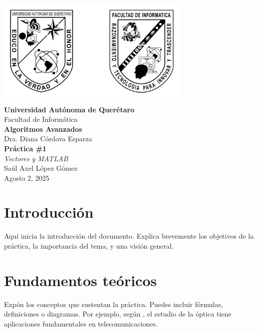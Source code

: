 \documentclass[12pt,a4paper]{article}
\begin{document}
\begin{titlepage}
    \begin{center}
        \includegraphics[width=0.7\textwidth]{images/logo_uaq_info.png}
        \vspace{1cm}

        {\Large \textbf{Universidad Autónoma de Querétaro}}\\[0.5cm]
        {\large Facultad de Informática}\\[1cm]

        {\Large \textbf{Algoritmos Avanzados}}\\[0.5cm]
        {\large Dra. Diana Córdova Esparza}\\[1.5cm]

        {\LARGE \textbf{Práctica \#1}}\\[0.2cm]
        {\large \textit{Vectores y MATLAB}}\\[1cm]

        {\large Saúl Axel López Gómez}\\[0.3cm]
        {\large Agosto 2, 2025}
    \end{center}
\end{titlepage}

\tableofcontents
\listoffigures
\listoftables
\lstlistoflistings
\clearpage

\section{Introducción}
Aquí inicia la introducción del documento. Explica brevemente los objetivos de la práctica, la importancia del tema, y una visión general.

\section{Fundamentos teóricos}
Expón los conceptos que sustentan la práctica. Puedes incluir fórmulas, definiciones o diagramas. Por ejemplo, según \cite{2022}, el estudio de la óptica tiene aplicaciones fundamentales en telecomunicaciones.
\end{document}
